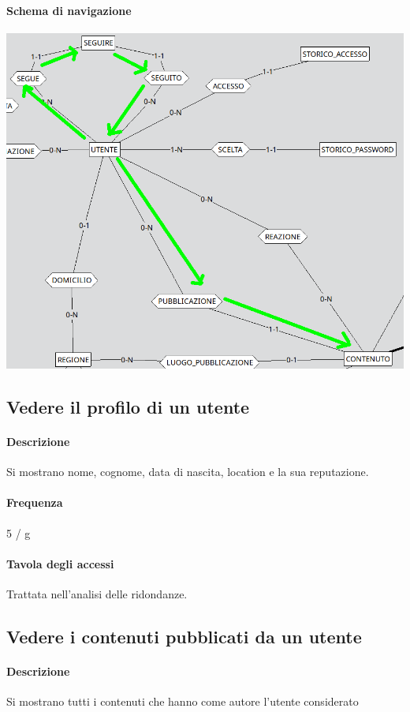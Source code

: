 \documentclass[a4paper,12pt]{report}
\begin{document}
\paragraph{Schema di navigazione\newline}
\includegraphics[scale=0.5]{./img/feed.png}
\subsection{Vedere il profilo di un utente} \label{vedere_profilo}
\paragraph{Descrizione} Si mostrano nome, cognome, data di nascita, location e la sua reputazione.
\paragraph{Frequenza} 5 / g
\paragraph{Tavola degli accessi}  
Trattata nell'analisi delle ridondanze.
\subsection{Vedere i contenuti pubblicati da un utente} \label{vedere_post_utente}
\paragraph{Descrizione} Si mostrano tutti i contenuti che hanno come autore l'utente considerato
\end{document}
